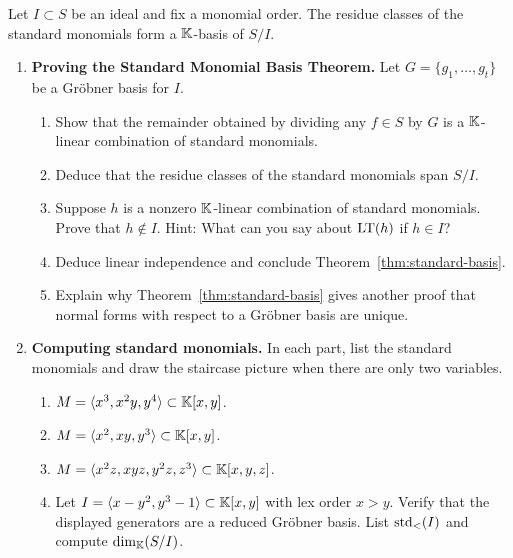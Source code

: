 \documentclass[Notebook.tex]{subfiles}
\begin{document}
\begin{theorem}\label{thm:standard-basis}
Let $I\subset S$ be an ideal and fix a monomial order. The residue classes of the standard monomials form a $\mathbb K$-basis of $S/I$.
\end{theorem}

\hrulefill

\begin{enumerate}[leftmargin=*, resume=problems]

\item \textbf{Proving the Standard Monomial Basis Theorem.} Let $G=\{g_1,\ldots,g_t\}$ be a Gr\"obner basis for $I$.
\begin{enumerate}[label=(\alph*),ref=\theenumi\alph*]
    \item Show that the remainder obtained by dividing any $f\in S$ by $G$ is a $\mathbb K$-linear combination of standard monomials.
    
    \item Deduce that the residue classes of the standard monomials span $S/I$.
    
    \item Suppose $h$ is a nonzero $\mathbb K$-linear combination of standard monomials. Prove that $h\notin I$. Hint: What can you say about $\text{LT}(h)$ if $h\in I$?
    
    \item Deduce linear independence and conclude Theorem~\ref{thm:standard-basis}.
    
    \item Explain why Theorem~\ref{thm:standard-basis} gives another proof that normal forms with respect to a Gr\"obner basis are unique.
\end{enumerate}

\item \textbf{Computing standard monomials.} In each part, list the standard monomials and draw the staircase picture when there are only two variables.
\begin{enumerate}[label=(\alph*),ref=\theenumi\alph*]
    \item $M=\langle x^3,x^2y,y^4\rangle\subset\mathbb K[x,y]$.
    
    \item $M=\langle x^2,xy,y^3\rangle\subset\mathbb K[x,y]$.
    
    \item $M=\langle x^2z,xyz,y^2z,z^3\rangle\subset\mathbb K[x,y,z]$.
    
    \item Let $I=\langle x-y^2,y^3-1\rangle\subset\mathbb K[x,y]$ with lex order $x>y$. Verify that the displayed generators are a reduced Gr\"obner basis. List $\operatorname{\text{std}}_<(I)$ and compute $\dim_{\mathbb K}(S/I)$.
    

\end{enumerate}
\end{enumerate}
\end{document}
